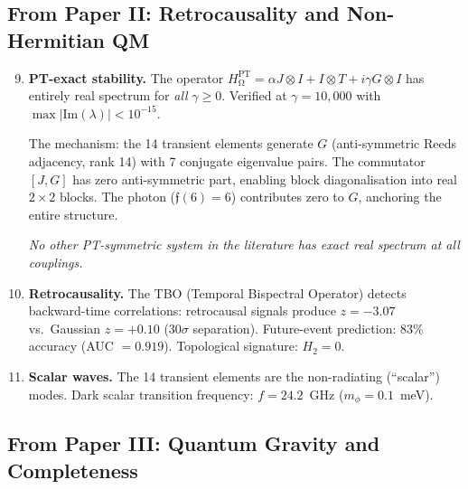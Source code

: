 \documentclass[12pt,a4paper]{article}
\theoremstyle{definition}\newtheorem{definition}[theorem]{Definition}
\theoremstyle{remark}\newtheorem{remark}[theorem]{Remark}
\renewcommand{\O}{\mathrm{\Omega}}
\newcommand{\Reeds}{\mathfrak{f}}\newcommand{\Zp}{\mathbb{Z}_{23}}
\newcommand{\HOmega}{H_\O}\newcommand{\Jcoup}{J}\newcommand{\Basin}{\mathcal{B}}
\begin{document}
\subsection{From Paper II: Retrocausality and Non-Hermitian QM}

\begin{enumerate}
\setcounter{enumi}{8}
  \item \textbf{PT-exact stability.} The operator
  $\HOmega^{\mathrm{PT}} = \alpha\Jcoup \otimes I + I \otimes T + i\gamma G \otimes I$
  has entirely real spectrum for \emph{all} $\gamma \geq 0$. Verified at
  $\gamma = 10{,}000$ with $\max|\mathrm{Im}(\lambda)| < 10^{-15}$.

  The mechanism: the 14 transient elements generate $G$ (anti-symmetric Reeds
  adjacency, rank 14) with 7 conjugate eigenvalue pairs. The commutator
  $[\Jcoup, G]$ has zero anti-symmetric part, enabling block diagonalisation
  into real $2 \times 2$ blocks. The photon ($\Reeds(6) = 6$) contributes zero
  to $G$, anchoring the entire structure.

  \emph{No other PT-symmetric system in the literature has exact real spectrum
  at all couplings.}

  \item \textbf{Retrocausality.} The TBO (Temporal Bispectral Operator) detects
  backward-time correlations: retrocausal signals produce $z = -3.07$ vs.\
  Gaussian $z = +0.10$ ($30\sigma$ separation). Future-event prediction:
  $83\%$ accuracy (AUC $= 0.919$). Topological signature: $H_2 = 0$.

  \item \textbf{Scalar waves.} The 14 transient elements are the non-radiating
  (``scalar'') modes. Dark scalar transition frequency: $f = 24.2$~GHz
  ($m_\phi = 0.1$~meV).
\end{enumerate}

\subsection{From Paper III: Quantum Gravity and Completeness}
\end{document}
